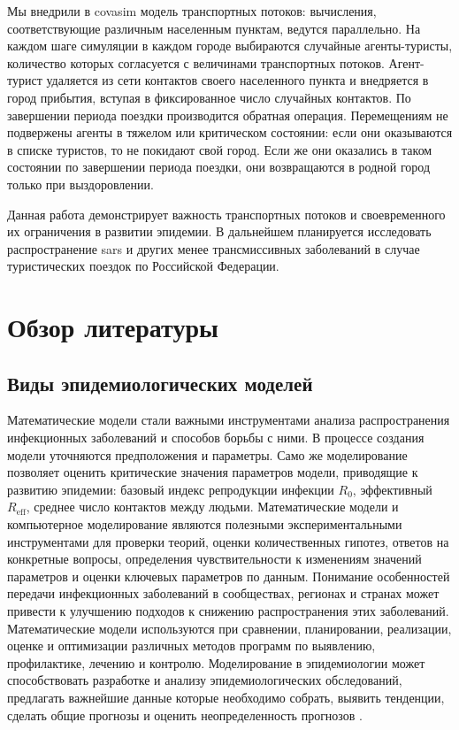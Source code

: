 \documentclass[a4paper,12pt]{article} %
\begin{document}
Мы внедрили в \gls{covasim} модель транспортных потоков: вычисления, соответствующие различным населенным пунктам, ведутся параллельно. На каждом шаге симуляции в каждом городе выбираются случайные агенты-туристы, количество которых согласуется с величинами транспортных потоков. Агент-турист удаляется из сети контактов своего населенного пункта и внедряется в город прибытия, вступая в фиксированное число случайных контактов. По завершении периода поездки производится обратная операция. Перемещениям не подвержены агенты в тяжелом или критическом состоянии: если они оказываются в списке туристов, то не покидают свой город. Если же они оказались в таком состоянии по завершении периода поездки, они возвращаются в родной город только при выздоровлении.

Данная работа демонстрирует важность транспортных потоков и своевременного их ограничения в развитии эпидемии. В дальнейшем планируется исследовать распространение \gls{sars} и других менее трансмиссивных заболеваний в случае туристических поездок по Российской Федерации.


\section{Обзор литературы}
\subsection{Виды эпидемиологических моделей}

Математические модели стали важными инструментами анализа распространения инфекционных заболеваний и способов борьбы с ними. В процессе создания модели уточняются предположения и параметры. Само же моделирование позволяет оценить критические значения параметров модели, приводящие к развитию эпидемии: базовый индекс репродукции инфекции $R_0$, эффективный $R_{\text{eff}}$, среднее число контактов между людьми. Математические модели и компьютерное моделирование являются полезными экспериментальными инструментами для проверки теорий, оценки количественных гипотез, ответов на конкретные вопросы, определения чувствительности к изменениям значений параметров и оценки ключевых параметров по данным. Понимание особенностей передачи инфекционных заболеваний в сообществах, регионах и странах может привести к улучшению подходов к снижению распространения этих заболеваний. Математические модели используются при сравнении, планировании, реализации, оценке и оптимизации различных методов
программ по выявлению, профилактике, лечению и контролю. Моделирование в эпидемиологии может способствовать разработке и анализу эпидемиологических обследований, предлагать важнейшие данные которые необходимо собрать, выявить тенденции, сделать общие прогнозы и оценить неопределенность прогнозов \cite{hethcote2000mathematics, hethcote1989three,hethcote1992transmission}.
\end{document}

